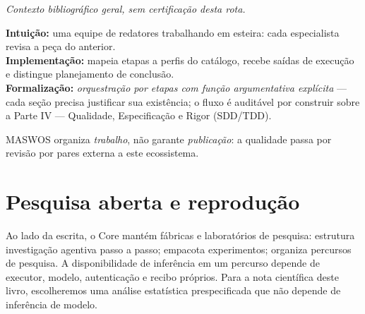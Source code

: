 \noindent\textit{Contexto bibliográfico geral, sem certificação desta rota.} 


\begin{niveis}
\textbf{Intuição:} uma equipe de redatores trabalhando em esteira: cada especialista
revisa a peça do anterior.\\
\textbf{Implementação:}  mapeia etapas a perfis do
catálogo, recebe saídas de execução e distingue planejamento de conclusão.\\
\textbf{Formalização:} \emph{orquestração por etapas com função argumentativa explícita} —
cada seção precisa justificar sua existência; o fluxo é auditável por construir
sobre a Parte IV — Qualidade, Especificação e Rigor (SDD/TDD).
\end{niveis}

\begin{aviso}
MASWOS organiza \emph{trabalho}, não garante \emph{publicação}: a qualidade passa
por revisão por pares externa a este ecossistema.
\end{aviso}

\clearpage
\section{Pesquisa aberta e reprodução}


\begin{descricao}
Ao lado da escrita, o Core mantém fábricas e laboratórios de pesquisa:
 estrutura investigação agentiva passo a passo;
 empacota experimentos;
 organiza percursos de pesquisa. A disponibilidade
de inferência em um percurso depende de executor, modelo, autenticação e
recibo próprios. Para a nota científica deste livro, escolheremos uma
análise estatística prespecificada que não depende de inferência de modelo.
\end{descricao}

